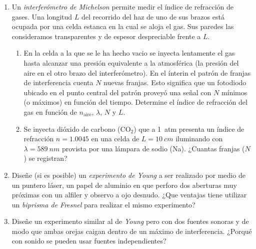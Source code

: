 \documentclass[11pt,spanish,a4paper]{article}
\begin{document}
\begin{enumerate}
\item Un \textit{interferómetro de Michelson} permite medir el índice de refracción de gases.
	Una longitud \( L \) del recorrido del haz de uno de sus brazos está ocupada por una celda estanca en la cual se aloja el gas.
	Sus paredes las consideramos transparentes y de espesor despreciable frente a \( L \).
	\begin{enumerate}
		\item En la celda a la que se le ha hecho vacio se inyecta lentamente el gas hasta alcanzar una presión equivalente a la atmosférica (la presión del aire en el otro brazo del interferómetro).
			En el ínterin el patrón de franjas de interferencia cuenta \( N \) nuevas franjas.
			Esto significa que un fotodiodo ubicado en el punto central del patrón proveyó una señal con \( N \) mínimos (o máximos) en función del tiempo.
			Determine el índice de refracción del gas en función de \( n_\mathrm{aire} \), \( \lambda \), \( N \) y \( L \).
	
		\item Se inyecta dióxido de carbono (CO\(_2\)) que a \SI{1}{atm} presenta un índice de refracción \(n= 1.0045 \) en una celda de \(L= \SI{10}{cm} \) iluminando con \( \lambda= \SI{589}{nm}\) provista por una lámpara de sodio (Na).
			¿Cuantas franjas (\( N \)) se registran?
	\end{enumerate}


\item Diseñe (si es posible) un \textit{experimento de Young} a ser realizado por medio de un puntero láser, un papel de aluminio en que perforo dos aberturas muy próximas con un alfiler y observo a ojo desnudo.
	¿Que ventajas tiene utilizar un \textit{biprisma de Fresnel} para realizar el mismo experimento?

	
\item Diseñe un experimento similar al de \textit{Young} pero con dos fuentes sonoras y de modo que ambas orejas caigan dentro de un máximo de interferencia.
	¿Porqué con sonido se pueden usar fuentes independientes?



\end{enumerate}
\end{document}
